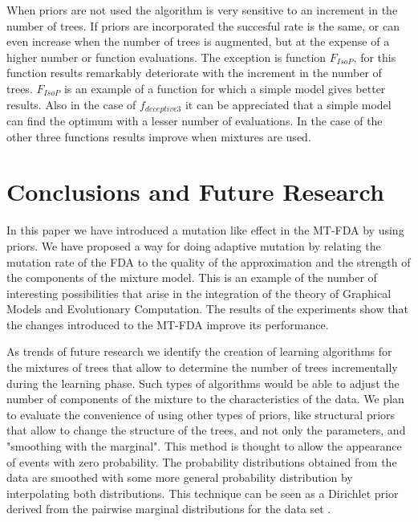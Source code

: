 \documentclass[runningheads]{llncs}
\begin{document}
When priors are not used the algorithm is very sensitive to an increment in the
number of trees. If priors are incorporated the succesful rate is the same, or can
even increase when the number of trees is augmented, but at the expense of a higher number or function evaluations. The
exception is function $F_{IsoP}$, for this function results remarkably deteriorate
with the increment in the number of trees. $F_{IsoP}$ is an example of a function for
which a simple model gives better results. Also in the case of
$f_{deceptive3}$ it can be appreciated that a simple model can find the optimum with
a lesser number of evaluations. In the case of the other three functions results
improve when mixtures are used. 

\section{Conclusions and Future Research} \label{CONCLUSIONS}

 In this paper we have introduced a mutation like effect in the MT-FDA by
 using priors. We have proposed a way for doing adaptive mutation by relating
 the mutation rate of the FDA to the quality of the approximation and the strength of
 the components of the mixture model. This is an example of the number of
 interesting possibilities that arise in the integration of the theory of
 Graphical Models and Evolutionary Computation.  The results of the experiments show that the changes introduced to the MT-FDA
 improve its performance.

 As trends of future research we identify the creation of learning algorithms
 for the mixtures of trees that allow to determine the number of trees
 incrementally during the learning phase. Such types of algorithms would be
 able to adjust the number of components of the mixture to the characteristics
 of the data.  We plan to evaluate the convenience of using other types of
 priors, like structural priors that allow to change the structure of the
 trees, and not only the parameters, and "smoothing
with the marginal". This method is thought to allow the appearance of events with zero probability. The
probability distributions obtained from the data are smoothed with some more general
probability distribution by interpolating both distributions. This technique
 can be seen as a Dirichlet prior derived from the pairwise marginal distributions for the data set
\cite{Meila_and_Jordan:2000}. 

   
   
  
   
\end{document}
